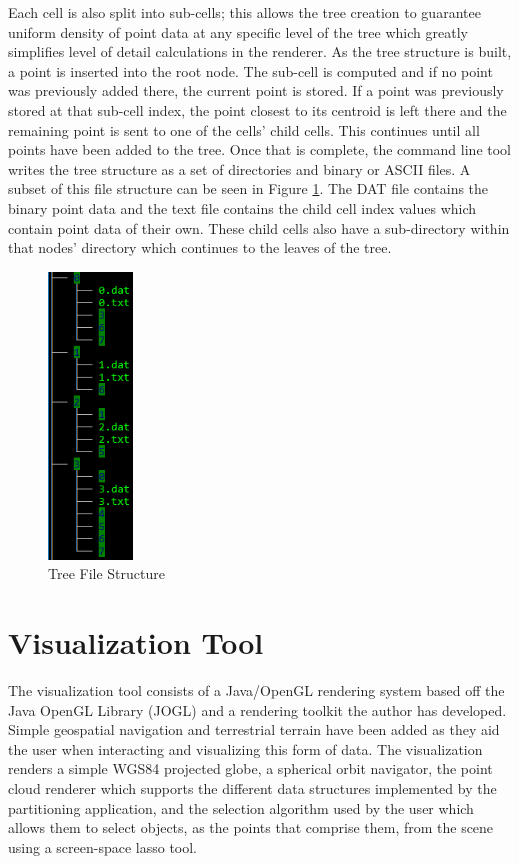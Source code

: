 Each cell is also split into sub-cells; this allows the tree creation to
guarantee uniform density of point data at any specific level of the tree which
greatly simplifies level of detail calculations in the renderer. As the tree
structure is built, a point is inserted into the root node. The sub-cell is
computed and if no point was previously added there, the current point is
stored. If a point was previously stored at that sub-cell index, the point
closest to its centroid is left there and the remaining point is sent to one of
the cells' child cells. This continues until all points have been added to the
tree. Once that is complete, the command line tool writes the tree structure as
a set of directories and binary or ASCII files. A subset of this file structure
can be seen in Figure \ref{fig:fileStructure}. The DAT file contains the binary
point data and the text file contains the child cell index values which contain point data of their
own. These child cells also have a sub-directory within that nodes’ directory
which continues to the leaves of the tree.

\begin{figure}[htp]
\begin{center}
  \includegraphics[height=3.0in]{images/filestructure.png}
  \caption{Tree File Structure}
  \label{fig:fileStructure}
\end{center}
\end{figure}

\section{Visualization Tool}

The visualization tool consists of a Java/OpenGL rendering system based off the
Java OpenGL Library (JOGL) and a rendering toolkit the author has developed.
Simple geospatial navigation and terrestrial terrain have been added as they aid
the user when interacting and visualizing this form of data. The visualization
renders a simple WGS84 projected globe, a spherical orbit navigator, the point
cloud renderer which supports the different data structures implemented by the
partitioning application, and the selection algorithm used by the user which
allows them to select objects, as the points that comprise them, from the scene
using a screen-space lasso tool.

